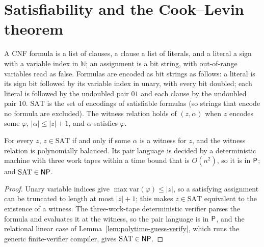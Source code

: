 \section{Satisfiability and the Cook--Levin theorem}

\begin{definition}
  \label{def:polytime-sat}
  \leanok
  A CNF formula is a list of clauses, a clause a list of literals, and a
  literal a sign with a variable index in $\mathbb{N}$; an assignment is a bit
  string, with out-of-range variables read as false. Formulas are encoded as
  bit strings as follows: a literal is its sign bit followed by its variable
  index in unary, with every bit doubled; each literal is followed by the
  undoubled pair $01$ and each clause by the undoubled pair $10$.
  $\mathrm{SAT}$ is the set of encodings of satisfiable formulas (so strings
  that encode no formula are excluded). The witness
  relation holds of $(z, \alpha)$ when $z$ encodes some $\varphi$,
  $|\alpha| \le |z| + 1$, and $\alpha$ satisfies $\varphi$.
\end{definition}

\begin{theorem}
  \label{thm:polytime-sat-np}
  \leanok
  For every $z$, $z \in \mathrm{SAT}$ if and only if some $\alpha$ is a
  witness for $z$, and the witness relation is polynomially balanced. Its pair
  language is decided by a deterministic machine with three work tapes within
  a time bound that is $O(n^2)$, so it is in $\mathsf{P}$; and
  $\mathrm{SAT} \in \mathsf{NP}$.
\end{theorem}
\begin{proof}
  \leanok
  Unary variable indices give $\max \mathrm{var}(\varphi) \le |z|$, so a
  satisfying assignment can be truncated to length at most $|z| + 1$; this
  makes $z \in \mathrm{SAT}$ equivalent to the existence of a witness. The
  three-work-tape deterministic verifier parses the formula and evaluates it
  at the witness, so the pair language is in $\mathsf{P}$, and the relational
  linear case of Lemma~\ref{lem:polytime-guess-verify}, which runs the generic
  finite-verifier compiler, gives $\mathrm{SAT} \in \mathsf{NP}$.
\end{proof}

